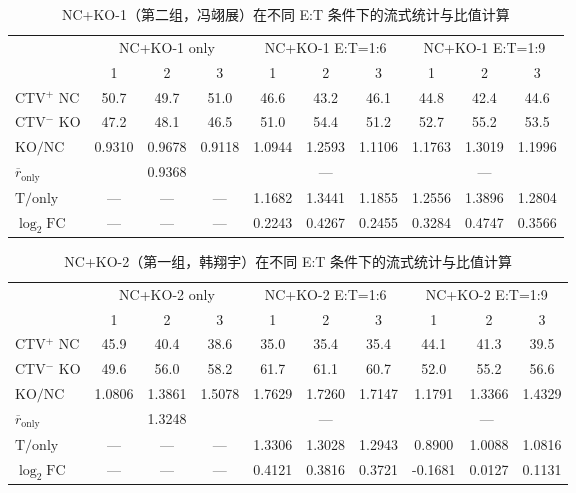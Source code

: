 \begin{table}[H]
    \centering
    \caption{NC+KO-1（第二组，冯翊展）在不同 E:T 条件下的流式统计与比值计算}
    \label{tab:fyz-ncko1}
    \begin{tabular}{lccccccccc}
        \toprule
        & \multicolumn{3}{c}{NC+KO-1 only}
        & \multicolumn{3}{c}{NC+KO-1 E:T=1:6}
        & \multicolumn{3}{c}{NC+KO-1 E:T=1:9} \\
        \cmidrule(lr){2-4}\cmidrule(lr){5-7}\cmidrule(lr){8-10}
        & 1 & 2 & 3 & 1 & 2 & 3 & 1 & 2 & 3 \\
        \midrule
        CTV$^+$ NC  & 50.7 & 49.7 & 51.0 & 46.6 & 43.2 & 46.1 & 44.8 & 42.4 & 44.6 \\
        CTV$^{-}$ KO  & 47.2 & 48.1 & 46.5 & 51.0 & 54.4 & 51.2 & 52.7 & 55.2 & 53.5 \\
        \midrule
        $\mathrm{KO/NC}$    & 0.9310 & 0.9678 & 0.9118 & 1.0944 & 1.2593 & 1.1106 & 1.1763 & 1.3019 & 1.1996 \\
        $\overline{r}_{\mathrm{only}}$ & \multicolumn{3}{c}{0.9368} & \multicolumn{3}{c}{---} & \multicolumn{3}{c}{---} \\
        \midrule
        $\mathrm{T/only}$   & ---  & ---  & --- & 1.1682 & 1.3441 & 1.1855 & 1.2556 & 1.3896 & 1.2804 \\
        $\log_2 \mathrm{FC}$   & ---  & ---  & --- & 0.2243 & 0.4267 & 0.2455 & 0.3284 & 0.4747 & 0.3566 \\
        \bottomrule
    \end{tabular}
\end{table}

\begin{table}[H]
    \centering
    \caption{NC+KO-2（第一组，韩翔宇）在不同 E:T 条件下的流式统计与比值计算}
    \label{tab:hxy-ncko2}
    \begin{tabular}{lccccccccc}
        \toprule
        & \multicolumn{3}{c}{NC+KO-2 only}
        & \multicolumn{3}{c}{NC+KO-2 E:T=1:6}
        & \multicolumn{3}{c}{NC+KO-2 E:T=1:9} \\
        \cmidrule(lr){2-4}\cmidrule(lr){5-7}\cmidrule(lr){8-10}
        & 1 & 2 & 3 & 1 & 2 & 3 & 1 & 2 & 3 \\
        \midrule
        CTV$^+$ NC  & 45.9 & 40.4 & 38.6 & 35.0 & 35.4 & 35.4 & 44.1 & 41.3 & 39.5 \\
        CTV$^{-}$ KO  & 49.6 & 56.0 & 58.2 & 61.7 & 61.1 & 60.7 & 52.0 & 55.2 & 56.6 \\
        \midrule
        $\mathrm{KO/NC}$    & 1.0806 & 1.3861 & 1.5078 & 1.7629 & 1.7260 & 1.7147 & 1.1791 & 1.3366 & 1.4329 \\
        $\overline{r}_{\mathrm{only}}$ & \multicolumn{3}{c}{1.3248} & \multicolumn{3}{c}{---} & \multicolumn{3}{c}{---} \\
        \midrule
        $\mathrm{T/only}$   & ---  & ---  & --- & 1.3306 & 1.3028 & 1.2943 & 0.8900 & 1.0088 & 1.0816 \\
        $\log_2 \mathrm{FC}$   & ---  & ---  & --- & 0.4121 & 0.3816 & 0.3721 & -0.1681 & 0.0127 & 0.1131 \\
        \bottomrule
    \end{tabular}
\end{table}

